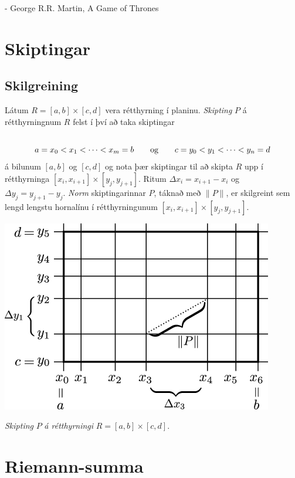 \documentclass[a4paper,10pt,icelandic]{sphinxmanual}
\begin{document}
- George R.R. Martin, A Game of Thrones


\section{Skiptingar}
\label{Kafli4:skiptingar}

\subsection{Skilgreining}
\label{Kafli4:skilgreining}
Látum \(R=[a,b]\times[c,d]\) vera rétthyrning í planinu. \emph{Skipting}
\(P\) á rétthyrningnum \(R\) felst í því að taka skiptingar
\begin{gather}
\begin{split}\displaystyle\end{split}\notag\\\begin{split}a=x_0<x_1<\cdots<x_m=b\qquad\mbox{og}\qquad
c=y_0<y_1<\cdots<y_n=d\end{split}\notag
\end{gather}
á bilunum \([a,b]\) og \([c,d]\) og nota þær skiptingar til að
skipta \(R\) upp í rétthyrninga
\([x_i,x_{i+1}]\times [y_j,y_{j+1}]\). Ritum
\(\Delta x_i=x_{i+1}-x_i\) og \(\Delta y_j=y_{j+1}-y_j\). \emph{Norm}
skiptingarinnar \(P\), táknað með \(\|P\|\), er skilgreint sem
lengd lengstu hornalínu í rétthyrningunum
\([x_i,x_{i+1}]\times [y_j,y_{j+1}]\).

{\hfill\includegraphics[width=0.500\linewidth]{skipting.png}\hfill}

\emph{Skipting} \(P\) \emph{á rétthyrningi} \(R= [a,b]\times [c,d]\).


\section{Riemann-summa}
\label{Kafli4:riemann-summa}
\end{document}
